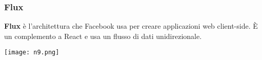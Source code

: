 \begin{frame}
\frametitle{Flux}
	\par
  	\textbf{Flux} è l’architettura che Facebook usa per creare applicazioni web client-side. È un complemento a React e usa un flusso di dati unidirezionale.\\
	\begin{flushright}	
  	\texttt{[image: n9.png]}
  	\end{flushright}	
\end{frame}



